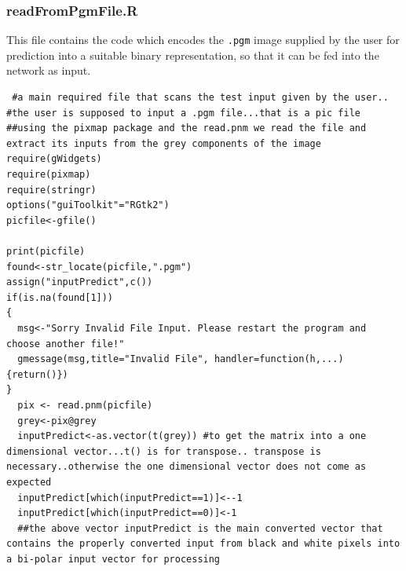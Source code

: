 \documentclass[a4paper,12pt]{report}
\begin{document}
\subsubsection*{readFromPgmFile.R}
This file contains the code which encodes the \verb+.pgm+ image supplied by the user for prediction into a suitable binary representation, so that 
it can be fed into the network as input.
\begin{verbatim}
 #a main required file that scans the test input given by the user..
#the user is supposed to input a .pgm file...that is a pic file 
##using the pixmap package and the read.pnm we read the file and extract its inputs from the grey components of the image
require(gWidgets)
require(pixmap)
require(stringr)
options("guiToolkit"="RGtk2")
picfile<-gfile()

print(picfile)
found<-str_locate(picfile,".pgm")
assign("inputPredict",c())
if(is.na(found[1]))
{
  msg<-"Sorry Invalid File Input. Please restart the program and choose another file!"
  gmessage(msg,title="Invalid File", handler=function(h,...){return()})
}
  pix <- read.pnm(picfile)
  grey<-pix@grey
  inputPredict<-as.vector(t(grey)) #to get the matrix into a one dimensional vector...t() is for transpose.. transpose is necessary..otherwise the one dimensional vector does not come as expected
  inputPredict[which(inputPredict==1)]<--1
  inputPredict[which(inputPredict==0)]<-1
  ##the above vector inputPredict is the main converted vector that contains the properly converted input from black and white pixels into a bi-polar input vector for processing

\end{verbatim}
\end{document}
